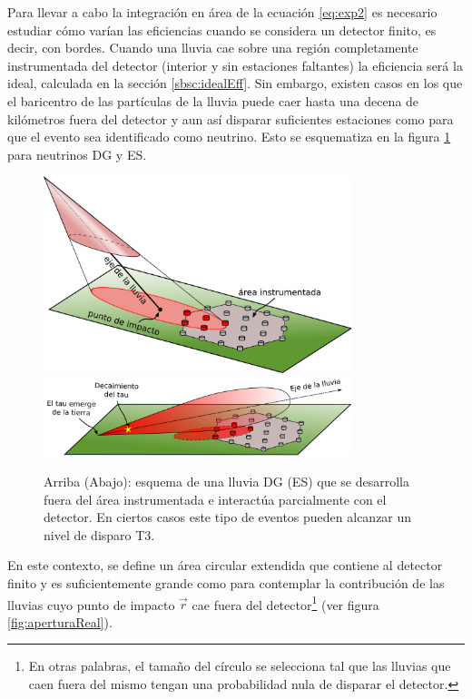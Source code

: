 	Para llevar a cabo la integración en área de la ecuación \ref{eq:exp2} es necesario estudiar cómo varían las eficiencias cuando se considera un detector finito, es decir, con bordes.
	Cuando una lluvia cae sobre una región completamente instrumentada del detector (interior y sin estaciones faltantes) la eficiencia será la ideal, calculada en la sección \ref{sbsc:idealEff}.
	Sin embargo, existen casos en los que el baricentro de las partículas de la lluvia puede caer hasta una decena de kilómetros fuera del detector y aun así disparar suficientes estaciones como para que el evento sea identificado como neutrino. 
	Esto se esquematiza en la figura \ref{fig:lluviaFuera} para neutrinos DG y ES.
	\begin{figure}[ht!]
		\begin{center}
			\includegraphics[width=0.8\textwidth]{fig/resultadosAuger/lluviaFuera}\\
			\vspace*{0.1\textwidth}
			\includegraphics[width=0.8\textwidth]{fig/resultadosAuger/lluviaFuera_ES}
			\caption{Arriba (Abajo): esquema de una lluvia DG (ES) que se desarrolla fuera del \'area instrumentada e interact\'ua parcialmente con el detector. En ciertos casos este tipo de eventos pueden alcanzar un nivel de disparo T3.}
			\label{fig:lluviaFuera}
		\end{center}
	\end{figure}
	
	En este contexto, se define un área circular extendida que contiene al detector finito y es suficientemente grande como para contemplar la contribución de las lluvias cuyo punto de impacto $\vec{r}$ cae fuera del detector\footnote{En otras palabras, el tamaño del círculo se selecciona tal que las lluvias que caen fuera del mismo tengan una probabilidad nula de disparar el detector.} (ver figura \ref{fig:aperturaReal}).
	
